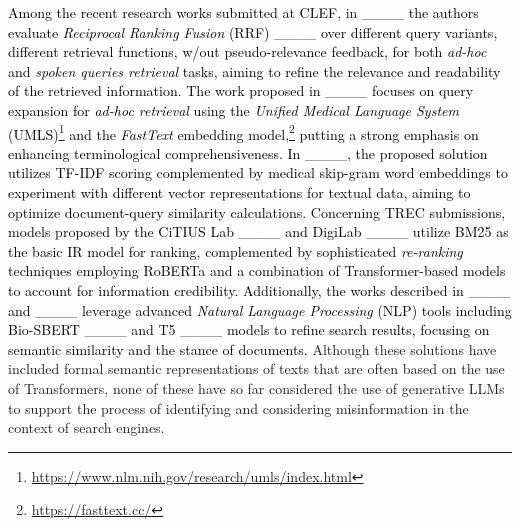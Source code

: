 \textcolor{black}{%
Among the recent research works submitted at CLEF,} in \textcolor{black}{____ the authors evaluate \textit{Reciprocal Ranking Fusion} (RRF) ____ over different query variants, different retrieval functions, w/out
pseudo-relevance feedback, for both \textit{ad-hoc} and \textit{spoken queries retrieval} tasks, aiming to refine the relevance and readability of the retrieved information. The work proposed in ____ focuses on query expansion for \textit{ad-hoc retrieval} using the \textit{Unified Medical Language System} (UMLS)\footnote{\url{https://www.nlm.nih.gov/research/umls/index.html}} and the \textit{FastText} embedding model,\footnote{\url{https://fasttext.cc/}} putting a strong emphasis on enhancing terminological comprehensiveness. In ____, the proposed solution utilizes TF-IDF scoring complemented by medical skip-gram word embeddings to experiment with different vector representations for textual data, aiming to optimize document-query similarity calculations. Concerning TREC submissions, %
models proposed by the CiTIUS Lab ____ and DigiLab ____ utilize BM25 as the basic IR model for ranking, complemented by sophisticated \textit{re-ranking} techniques employing RoBERTa and a combination of Transformer-based models to account for information credibility. Additionally, the works described in ____ and ____ leverage advanced \textit{Natural Language Processing} (NLP) tools including Bio-SBERT ____ and T5 ____ models to refine search results, focusing on semantic similarity and the stance of documents.} Although these solutions have included formal semantic representations of texts that are often based on the use of Transformers, none of these have so far considered the use of generative LLMs to support the process of identifying and considering misinformation in the context of search engines.

